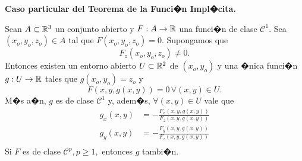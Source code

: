 \documentclass[a4paper]{scrartcl} %
\begin{document}
\begin{theorem}\textbf{Caso particular del Teorema de la Funci�n Impl�cita.} \label{teo:implicit_part}
\mbox{}

Sean $A \subset \mathbb{R}^3$ un conjunto abierto y $F: A \to \mathbb{R}$ una funci�n de clase $\mathcal{C}^1$. Sea $(x_o,y_o,z_o) \in A$ tal que $F(x_o,y_o,z_o) = 0$. Supongamos que 
 \[
   F_z (x_o,y_o,z_o) \ne 0.
 \]
 Entonces existen un entorno abierto $U \subset \mathbb{R}^2$ de $(x_o,y_o)$
 y una �nica funci�n $g: U \to \mathbb{R}$ tales que $g(x_o,y_o) = z_o$ y
 \[
  F(x,y,g(x,y)) = 0 \, \forall (x,y) \in U.
 \]
 M�s a�n, $g$ es de clase $\mathcal{C}^1$ y, adem�s, $\forall (x,y) \in U$ vale que
 \begin{align*}
  g_{x}(x,y) &= -\frac{F_x (x,y,g(x,y))}{F_z (x,y,g(x,y))}  \\
  g_{y}(x,y) &= -\frac{F_y (x,y,g(x,y))}{F_z (x,y,g(x,y))} \\
 \end{align*}
 Si $F$ es de clase $\mathcal{C}^p, p \ge 1,$ entonces $g$ tambi�n.
 
\end{theorem}
\end{document}

